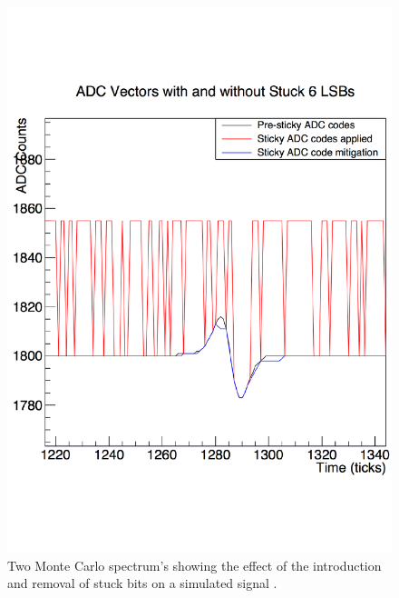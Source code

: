 \begin{figure}[h!]
\begin{minipage}{0.45\textwidth}
    \includegraphics[width=\textwidth]{StuckCodes2}
  \end{minipage}
  \caption[Recovering stuck ADC codes in the 35 ton]{Two Monte Carlo spectrum's showing the effect of the introduction and removal of stuck bits on a simulated signal \citep{InslerStuckCode}.}
  \label{fig:StuckCodes}
\end{figure}

